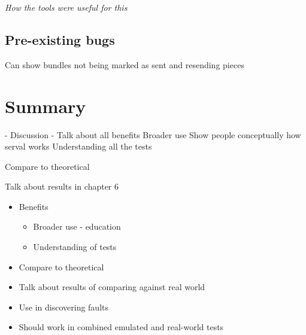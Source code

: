 \emph{How the tools were useful for this}

\subsection{Pre-existing bugs}
Can show bundles not being marked as sent and resending pieces 

\section{Summary}

- Discussion
- Talk about all benefits
Broader use
Show people conceptually how serval works
Understanding all the tests

Compare to theoretical

Talk about results in chapter 6

\begin{itemize}
    \item Benefits
    \begin{itemize}
        \item Broader use - education
        \item Understanding of tests
    \end{itemize}
    \item Compare to theoretical
    \item Talk about results of comparing against real world
    \item Use in discovering faults
    \item Should work in combined emulated and real-world tests
\end{itemize}


